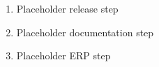 \begin{enumerate}
    \item Placeholder release step
    \item Placeholder documentation step
    \item Placeholder ERP step
\end{enumerate}
